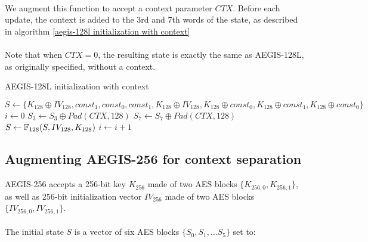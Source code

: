 \documentclass[envcountsame,runningheads,notitlepage]{llncs}
\begin{document}
\paragraph{}

We augment this function to accept a context parameter $CTX$.
Before each update, the context is added to the 3rd and 7th words of the state, as described in algorithm \ref{aegis-128l initialization with context}

\paragraph{}

Note that when $CTX = 0$, the resulting state is exactly the same as AEGIS-128L, as originally specified, without a context.

\begin{algorithm}
  \caption{AEGIS-128L initialization with context}
  \label{aegis-128l initialization with context}
  \begin{algorithmic}
    \State $S \gets \{ K_{128} \oplus IV_{128}, const_1, const_0, const_1, K_{128} \oplus IV_{128}, K_{128} \oplus const_0, K_{128} \oplus const_1, K_{128} \oplus const_0 \}$
    \State $i \gets 0$
    \State $S_3 \gets S_3 \oplus Pad(CTX, 128)$
    \State $S_7 \gets S_7 \oplus Pad(CTX, 128)$
    \State $S \gets \mathbb{F}_{128}(S, IV_{128}, K_{128})$
    \State $i \gets i+1$
    \EndWhile
    \EndFunction
  \end{algorithmic}
\end{algorithm}

\subsection{Augmenting AEGIS-256 for context separation}
\label{sec:augmenting AEGIS-256 for context separation}

AEGIS-256 accepts a 256-bit key $K_{256}$ made of two AES blocks $\{ K_{256,0}, K_{256,1} \}$, as well as 256-bit initialization vector $IV_{256}$ made of two AES blocks $\{ IV_{256,0}, IV_{256,1} \}$.

\paragraph{}

The initial state $S$ is a vector of six AES blocks $\{S_0, S_1, \ldots S_5\}$ set to:
\end{document}
